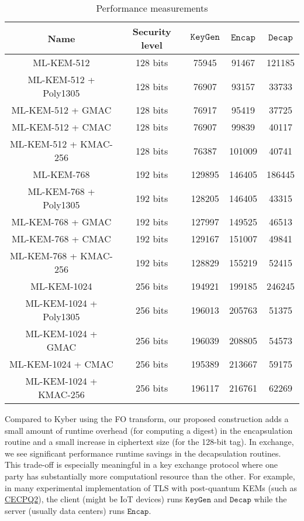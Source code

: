\documentclass[floatrow,journal=tches,submission]{iacrtrans}
\newcommand{\keygen}{\texttt{KeyGen}}
\newcommand{\encap}{\texttt{Encap}}
\newcommand{\decap}{\texttt{Decap}}
\begin{document}
\begin{table}[H]
    \centering
    \begin{tabular}{|c|c|c|c|c|}
        \hline
        Name & Security level & $\keygen$ & $\encap$ & $\decap$ \\
        \hline
        ML-KEM-512 & 128 bits & 75945 & 91467& 121185 \\
        \hline
        ML-KEM-512 + Poly1305& 128 bits & 76907 & 93157 & 33733 \\
        \hline
        ML-KEM-512 + GMAC& 128 bits & 76917 & 95419 & 37725 \\
        \hline
        ML-KEM-512 + CMAC& 128 bits & 76907 & 99839 & 40117 \\
        \hline
        ML-KEM-512 + KMAC-256& 128 bits & 76387 & 101009 & 40741 \\
        \hline
        ML-KEM-768 & 192 bits & 129895 & 146405& 186445 \\
        \hline
        ML-KEM-768 + Poly1305& 192 bits & 128205 & 146405& 43315 \\
        \hline
        ML-KEM-768 + GMAC& 192 bits & 127997 & 149525 & 46513 \\
        \hline
        ML-KEM-768 + CMAC& 192 bits & 129167 & 151007 & 49841 \\
        \hline
        ML-KEM-768 + KMAC-256& 192 bits & 128829 & 155219 & 52415 \\
        \hline
        ML-KEM-1024 & 256 bits & 194921 & 199185 & 246245 \\
        \hline
        ML-KEM-1024 + Poly1305& 256 bits & 196013 & 205763 & 51375 \\
        \hline
        ML-KEM-1024 + GMAC& 256 bits & 196039 & 208805 & 54573 \\
        \hline
        ML-KEM-1024 + CMAC& 256 bits & 195389 & 213667 & 59175 \\
        \hline
        ML-KEM-1024 + KMAC-256& 256 bits & 196117 & 216761 & 62269 \\
        \hline
    \end{tabular}
    \caption{Performance measurements}\label{tbl:kyber-ae-perf}
\end{table}

Compared to Kyber using the FO transform, our proposed construction adds a small amount of runtime overhead (for computing a digest) in the encapsulation routine and a small increase in ciphertext size (for the 128-bit tag). In exchange, we see significant performance runtime savings in the decapsulation routines. This trade-off is especially meaningful in a key exchange protocol where one party has substantially more computationl resource than the other. For example, in many experimental implementation of TLS with post-quantum KEMs (such as \href{https://blog.cloudflare.com/the-tls-post-quantum-experiment/}{CECPQ2}), the client (might be IoT devices) runs $\keygen$ and $\decap$ while the server (usually data centers) runs $\encap$.
\end{document}
